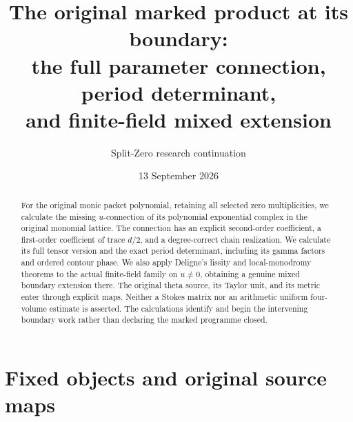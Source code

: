 \documentclass[11pt]{article}
\title{The original marked product at its boundary:\\
the full parameter connection, period determinant,\\
and finite-field mixed extension}
\author{Split-Zero research continuation}
\date{13 September 2026}
\begin{document}
\maketitle

\begin{abstract}
For the original monic packet polynomial, retaining all selected zero
multiplicities, we calculate the missing $u$-connection of its polynomial
exponential complex in the original monomial lattice.  The connection has
an explicit second-order coefficient, a first-order coefficient of trace
$d/2$, and a degree-correct chain realization.  We calculate its full
tensor version and the exact period determinant, including its gamma
factors and ordered contour phase.  We also apply Deligne's lissity and
local-monodromy theorems to the actual finite-field family on $u\ne0$,
obtaining a genuine mixed boundary extension there.  The original theta
source, its Taylor unit, and its metric enter through explicit maps.
Neither a Stokes matrix nor an arithmetic uniform four-volume estimate is
asserted.  The calculations identify and begin the intervening boundary
work rather than declaring the marked programme closed.
\end{abstract}

\section{Fixed objects and original source maps}
\end{document}
